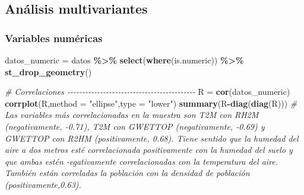 \documentclass[12pt,a4paper,]{book}
\newenvironment{Shaded}{\begin{snugshade}}{\end{snugshade}}
\newcommand{\AttributeTok}[1]{\textcolor[rgb]{0.13,0.29,0.53}{#1}}
\newcommand{\CommentTok}[1]{\textcolor[rgb]{0.56,0.35,0.01}{\textit{#1}}}
\newcommand{\FunctionTok}[1]{\textcolor[rgb]{0.13,0.29,0.53}{\textbf{#1}}}
\newcommand{\NormalTok}[1]{#1}
\newcommand{\OtherTok}[1]{\textcolor[rgb]{0.56,0.35,0.01}{#1}}
\newcommand{\SpecialCharTok}[1]{\textcolor[rgb]{0.81,0.36,0.00}{\textbf{#1}}}
\newcommand{\StringTok}[1]{\textcolor[rgb]{0.31,0.60,0.02}{#1}}
\numberwithin{dummy}{section}
\theoremstyle{ocrenumbox}
\theoremstyle{blacknumex}
\theoremstyle{blacknumbox}
\theoremstyle{ocrenum}
\theoremstyle{ocrenum}
\begin{document}
\hypertarget{anuxe1lisis-multivariantes}{%
\subsection{Análisis multivariantes}\label{anuxe1lisis-multivariantes}}

\hypertarget{variables-numuxe9ricas}{%
\subsubsection*{Variables numéricas}\label{variables-numuxe9ricas}}

\begin{Shaded}
\begin{Highlighting}[]
\NormalTok{datos\_numeric }\OtherTok{=}\NormalTok{ datos }\SpecialCharTok{\%\textgreater{}\%} 
  \FunctionTok{select}\NormalTok{(}\FunctionTok{where}\NormalTok{(is.numeric)) }\SpecialCharTok{\%\textgreater{}\%} 
  \FunctionTok{st\_drop\_geometry}\NormalTok{()}

\CommentTok{\# Correlaciones {-}{-}{-}{-}{-}{-}{-}{-}{-}{-}{-}{-}{-}{-}{-}{-}{-}{-}{-}{-}{-}{-}{-}{-}{-}{-}{-}{-}{-}{-}{-}{-}{-}{-}{-}{-}{-}{-}{-}{-}{-}{-}{-}}
\NormalTok{R }\OtherTok{=} \FunctionTok{cor}\NormalTok{(datos\_numeric)}
\FunctionTok{corrplot}\NormalTok{(R,}\AttributeTok{method =} \StringTok{"ellipse"}\NormalTok{,}\AttributeTok{type =} \StringTok{"lower"}\NormalTok{)}
\FunctionTok{summary}\NormalTok{(R}\SpecialCharTok{{-}}\FunctionTok{diag}\NormalTok{(}\FunctionTok{diag}\NormalTok{(R)))}
\CommentTok{\# Las variables más correlacionadas en la muestra son T2M con RH2M (negativamente, {-}0.71), T2M con GWETTOP (negativamente, {-}0.69) y GWETTOP con R2HM (positivamente, 0.68). Tiene sentido que la humedad del aire a dos metros esté correlacionada positivamente con la humedad del suelo y que ambas estén {-}egativamente correlacionadas con la temperatura del aire. También están correladas la población con la densidad de población (positivamente,0.63).}



\end{Highlighting}
\end{Shaded}
\end{document}
